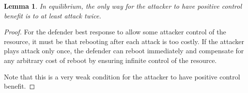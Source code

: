 \documentclass[11pt]{article}
\theoremstyle{plain}
\newtheorem{lemma}[theorem]{Lemma}
\begin{document}
\begin{comment}
First, we note that at any step of the game, the attacker has only one information set available. Thus, the consistency 
\textbf{Note don't have to check attacker bc for him there is only one information set.}, How to argue through the abysmal information set that keeps getting larger and more numerous? Use the fact that any deviation is noticed right away, so it could be either of 2 cases: Deviation by attacker just happened, so Defender reboots. OR, deviation didn't happan, in which the first node argument works.
Possible argument: We don't have to trace all the way back, in fact, first node argument is good enough.
\textbf{TODO: FINISH THE PROOF!}
	We show this is a Nash equilibrium of the game by showing that there is no unilateral deviation by either one of the player that results in higher payoff for the deviator.
	\\\\
	For the attacker, any deviation means playing some number of probes. Since all the probes will be rebooted right after, there is no control benefit gain. Thus, this results in negative average gain due to the costs of probe, whereas in the original state the attacker receives zero average gain.
	\\\\
	For the defender, the original gain of 1 is the maximum attainable payoff. Thus, there is no beneficial deviation.
\end{comment}

\begin{lemma} In equilibrium, the only way for the attacker to have positive control benefit is to at least {attack} twice.
\end{lemma}
\begin{proof}
For the defender best response to allow some attacker control of the resource, it must be that rebooting after each {attack} is too costly. If the attacker plays attack only once, the defender can reboot immediately and compensate for any arbitrary cost of reboot by ensuring infinite control of the resource.

Note that this is a very weak condition for the attacker to have positive control benefit.
\end{proof}
	
\end{document}
